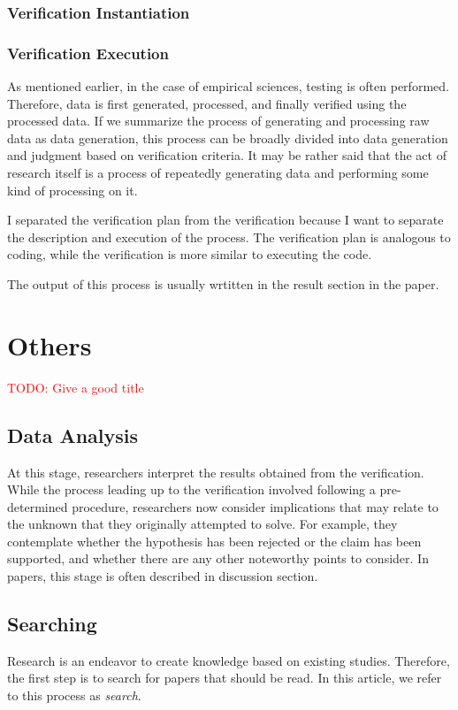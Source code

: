 \documentclass{book}
\begin{document}
\subsubsection{Verification Instantiation}

\subsubsection{Verification Execution}

As mentioned earlier, in the case of empirical sciences, testing is often performed. Therefore, data is first generated, processed, and finally verified using the processed data. If we summarize the process of generating and processing raw data as data generation, this process can be broadly divided into data generation and judgment based on verification criteria. It may be rather said that the act of research itself is a process of repeatedly generating data and performing some kind of processing on it.

I separated the verification plan from the verification because I want to separate the description and execution of the process. The verification plan is analogous to coding, while the verification is more similar to executing the code.

The output of this process is usually wrtitten in the result section in the paper.

\section{Others}
\textcolor{red}{TODO: Give a good title}

\subsection{Data Analysis}
At this stage, researchers interpret the results obtained from the verification. While the process leading up to the verification involved following a pre-determined procedure, researchers now consider implications that may relate to the unknown that they originally attempted to solve. For example, they contemplate whether the hypothesis has been rejected or the claim has been supported, and whether there are any other noteworthy points to consider. In papers, this stage is often described in discussion section.

\subsection{Searching}
Research is an endeavor to create knowledge based on existing studies. Therefore, the first step is to search for papers that should be read. In this article, we refer to this process as \textit{search}.
\end{document}
